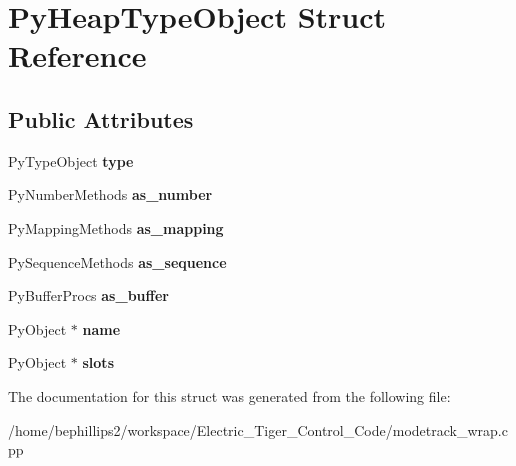 \hypertarget{struct_py_heap_type_object}{\section{Py\-Heap\-Type\-Object Struct Reference}
\label{struct_py_heap_type_object}
}
\subsection*{Public Attributes}
\begin{DoxyCompactItemize}
\item 
\hypertarget{struct_py_heap_type_object_a8b961137de4ebeed5a5d2e4b47ee1ca7}{Py\-Type\-Object {\bfseries type}}\label{struct_py_heap_type_object_a8b961137de4ebeed5a5d2e4b47ee1ca7}

\item 
\hypertarget{struct_py_heap_type_object_a795de378df40d11321c0dbe463759560}{Py\-Number\-Methods {\bfseries as\-\_\-number}}\label{struct_py_heap_type_object_a795de378df40d11321c0dbe463759560}

\item 
\hypertarget{struct_py_heap_type_object_a3112d193aea288a92036360bec1ce0a5}{Py\-Mapping\-Methods {\bfseries as\-\_\-mapping}}\label{struct_py_heap_type_object_a3112d193aea288a92036360bec1ce0a5}

\item 
\hypertarget{struct_py_heap_type_object_ad553caad5da3a7004aae1b7ac0289f12}{Py\-Sequence\-Methods {\bfseries as\-\_\-sequence}}\label{struct_py_heap_type_object_ad553caad5da3a7004aae1b7ac0289f12}

\item 
\hypertarget{struct_py_heap_type_object_a026c64b0a5163ea580e79640ecf209de}{Py\-Buffer\-Procs {\bfseries as\-\_\-buffer}}\label{struct_py_heap_type_object_a026c64b0a5163ea580e79640ecf209de}

\item 
\hypertarget{struct_py_heap_type_object_a5440c0413b3c519d996119695c957c80}{Py\-Object $\ast$ {\bfseries name}}\label{struct_py_heap_type_object_a5440c0413b3c519d996119695c957c80}

\item 
\hypertarget{struct_py_heap_type_object_a15212a8f85d939b3f4b133ecda1b62e5}{Py\-Object $\ast$ {\bfseries slots}}\label{struct_py_heap_type_object_a15212a8f85d939b3f4b133ecda1b62e5}

\end{DoxyCompactItemize}


The documentation for this struct was generated from the following file\-:\begin{DoxyCompactItemize}
\item 
/home/bephillips2/workspace/\-Electric\-\_\-\-Tiger\-\_\-\-Control\-\_\-\-Code/modetrack\-\_\-wrap.\-cpp\end{DoxyCompactItemize}
